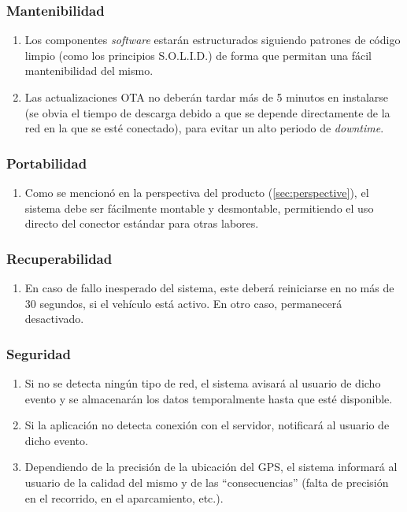 \subsubsection{Mantenibilidad}
\begin{enumerate}[resume, label=\textbf{\texttt{RNF-\arabic*}}]
  \item\label{nf:solid} Los componentes \textit{software} estarán estructurados
  siguiendo patrones de código limpio (como los principios S.O.L.I.D.) de forma
  que permitan una fácil mantenibilidad del mismo.
  \item\label{nf:ota-time} Las actualizaciones OTA no deberán tardar más de
  5 minutos en instalarse (se obvia el tiempo de descarga debido a que se depende
  directamente de la red en la que se esté conectado), para evitar un alto periodo
  de \textit{downtime}.
\end{enumerate}

\subsubsection{Portabilidad}
\begin{enumerate}[resume, label=\textbf{\texttt{RNF-\arabic*}}]
  \item\label{nf:easy-conn} Como se mencionó en la perspectiva del producto (\ref{sec:perspective}),
  el sistema debe ser fácilmente montable y desmontable, permitiendo el uso directo
  del conector estándar para otras labores.
\end{enumerate}

\subsubsection{Recuperabilidad}
\begin{enumerate}[resume, label=\textbf{\texttt{RNF-\arabic*}}]
  \item\label{nf:restart-time} En caso de fallo inesperado del sistema, este
  deberá reiniciarse en no más de 30 segundos, si el vehículo está activo. En otro
  caso, permanecerá desactivado.
\end{enumerate}

\subsubsection{Seguridad}
\begin{enumerate}[resume, label=\textbf{\texttt{RNF-\arabic*}}]
  \item\label{nf:err-mobile} Si no se detecta ningún tipo de red, el sistema
  avisará al usuario de dicho evento y se almacenarán los datos temporalmente hasta
  que esté disponible.
  \item\label{nf:err-app} Si la aplicación no detecta conexión con el servidor,
  notificará al usuario de dicho evento.
  \item\label{nf:err-gps} Dependiendo de la precisión de la ubicación del GPS,
  el sistema informará al usuario de la calidad del mismo y de las ``consecuencias''
  (falta de precisión en el recorrido, en el aparcamiento, etc.).
\end{enumerate}

